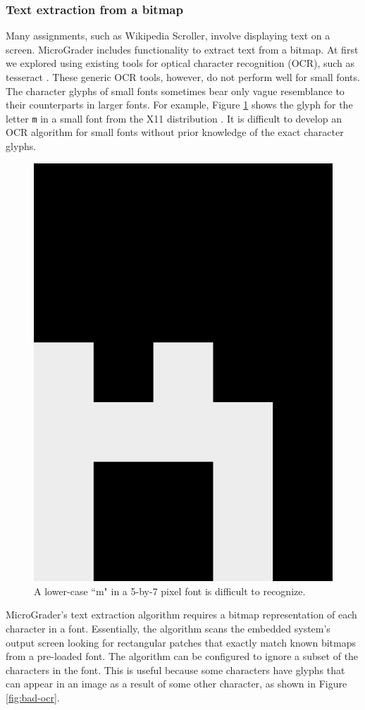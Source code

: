 \documentclass[12pt]{article}
\begin{document}
\subsubsection{Text extraction from a bitmap}
Many assignments, such as Wikipedia Scroller, involve displaying text on a screen.  MicroGrader includes functionality to extract text from a bitmap.  At first we explored using existing tools for optical character recognition (OCR), such as tesseract \cite{tesseract}.  These generic OCR tools, however, do not perform well for small fonts.  The character glyphs of small fonts sometimes bear only vague resemblance to their counterparts in larger fonts.  For example, Figure \ref{fig:small-glyph} shows the glyph for the letter \texttt{m} in a small font from the X11 distribution \cite{5x7}.  It is difficult to develop an OCR algorithm for small fonts without prior knowledge of the exact character glyphs.


\begin{figure}
\centering
\includegraphics[width=0.3\linewidth]{glyph-m.png}
\caption{A lower-case ``m" in a 5-by-7 pixel font is difficult to recognize.}
\label{fig:small-glyph}
\end{figure}

MicroGrader's text extraction algorithm requires a bitmap representation of each character in a font.  Essentially, the algorithm scans the embedded system's output screen looking for rectangular patches that exactly match known bitmaps from a pre-loaded font.  The algorithm can be configured to ignore a subset of the characters in the font.  This is useful because some characters have glyphs that can appear in an image as a result of some other character, as shown in Figure \ref{fig:bad-ocr}.
\end{document}
